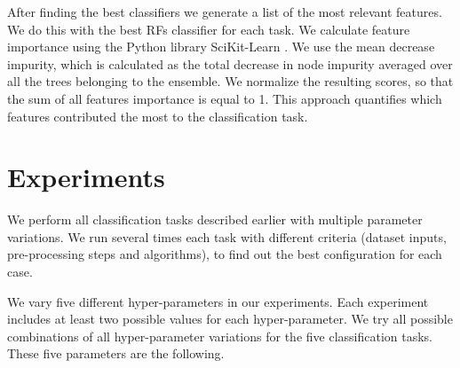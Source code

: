 \documentclass[a4paper,fleqn,usenatbib]{mnras}
\begin{document}
After finding the best classifiers we generate a list of the most
relevant features. 
We do this with the best RFs classifier for each task.
We calculate feature importance using the Python library 
SciKit-Learn \citep{1201.0490}. We use the mean decrease impurity, 
which is calculated as the total decrease in node impurity averaged over all the trees belonging to
the ensemble.
We normalize the resulting scores, so that the sum of all features
importance is equal to 1.
This approach quantifies which features contributed the most to the
classification task.  

\section{Experiments} \label{section_experimentation}

We perform all classification tasks described earlier with multiple
parameter variations.  
We run several times each task with different criteria 
(dataset inputs, pre-processing steps and algorithms), 
to find out the best configuration for each case.

We vary five different hyper-parameters in our experiments.
Each experiment includes at least two possible values for each
hyper-parameter.
We try all possible combinations of all hyper-parameter variations 
for the five classification tasks. 
These five parameters are the following. 
\end{document}
